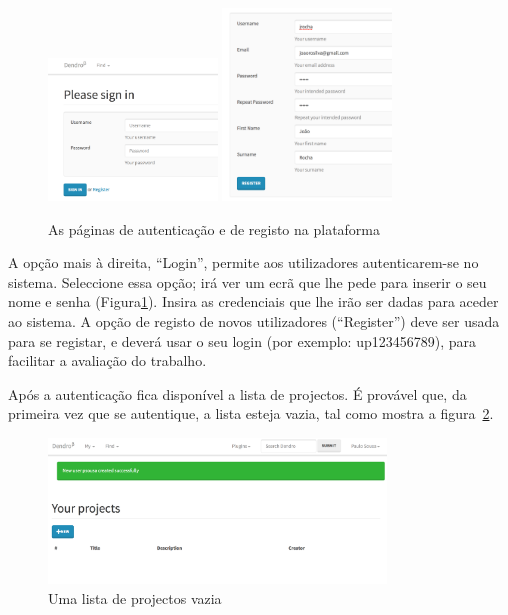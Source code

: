 \documentclass[paper=a4, fontsize=11pt]{scrartcl} %
\numberwithin{equation}{section} %
\numberwithin{figure}{section} %
\numberwithin{table}{section} %
\begin{document}
\begin{figure}[h!t!]
	\centering
	\includegraphics[width=0.4\textwidth]{Images/login}	
	\includegraphics[width=0.4\textwidth]{Images/register}
	\caption{As páginas de autenticação e de registo na plataforma}
	\label{fig:login_and_register_pages}
\end{figure}

A opção mais à direita, ``Login'', permite aos utilizadores autenticarem-se no sistema. Seleccione essa opção; irá ver um ecrã que lhe pede para inserir o seu nome e senha (Figura\ref{fig:login_and_register_pages}). Insira as credenciais que lhe irão ser dadas para aceder ao sistema. A opção de registo de novos utilizadores (``Register'') deve ser usada para se registar, e deverá usar o seu login (por exemplo: up123456789), para facilitar a avaliação do trabalho.

Após a autenticação fica disponível a lista de projectos. É provável que, da primeira vez que se autentique, a lista esteja vazia, tal como mostra a figura~\ref{fig:empty_list_of_projects}. 

\begin{figure}[h!t!]
	\centering
	\includegraphics[width=0.8\textwidth]{Images/empty_list_of_projects}	
	\caption{Uma lista de projectos vazia}
	\label{fig:empty_list_of_projects}
\end{figure}
\end{document}
